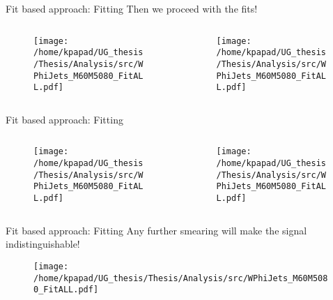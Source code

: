 \documentclass[bigger]{beamer}
\begin{document}
\begin{frame}[label={sec:org6820dc5}]{Fit based approach: Fitting}
Then we proceed with the fits!
\begin{columns}
\begin{column}{0.5\columnwidth}
\begin{figure}[h]
\centering
\texttt{[image: /home/kpapad/UG\_thesis/Thesis/Analysis/src/WPhiJets\_M60M5080\_FitALL.pdf]}
\end{figure}
\end{column}

\begin{column}{0.5\columnwidth}
\begin{figure}[h]
\centering
\texttt{[image: /home/kpapad/UG\_thesis/Thesis/Analysis/src/WPhiJets\_M60M5080\_FitALL.pdf]}
\end{figure}
\end{column}
\end{columns}
\end{frame}

\begin{frame}[label={sec:orgf75ed2c}]{Fit based approach: Fitting}
\begin{columns}
\begin{column}{0.5\columnwidth}
\begin{figure}[h]
\centering
\texttt{[image: /home/kpapad/UG\_thesis/Thesis/Analysis/src/WPhiJets\_M60M5080\_FitALL.pdf]}
\end{figure}
\end{column}

\begin{column}{0.5\columnwidth}
\begin{figure}[h]
\centering
\texttt{[image: /home/kpapad/UG\_thesis/Thesis/Analysis/src/WPhiJets\_M60M5080\_FitALL.pdf]}
\end{figure}
\end{column}
\end{columns}
\end{frame}

\begin{frame}[label={sec:org62ba991}]{Fit based approach: Fitting}
Any further smearing will make the signal indistinguishable!
\begin{figure}[h]
\centering
\texttt{[image: /home/kpapad/UG\_thesis/Thesis/Analysis/src/WPhiJets\_M60M5080\_FitALL.pdf]}
\end{figure}
\end{frame}
\end{document}
